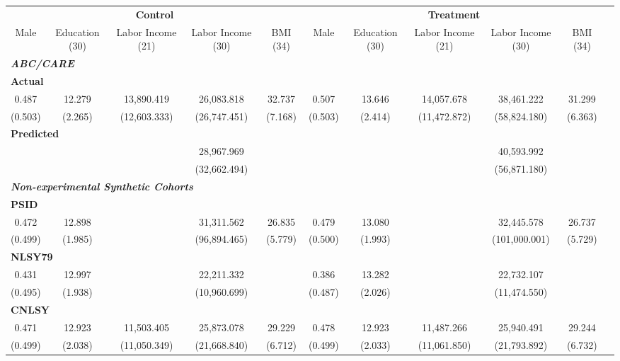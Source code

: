 \begin{tabular}{ccccccccccc} \toprule
\multicolumn{5}{c}{\textbf{Control}} & \multicolumn{5}{c}{\textbf{Treatment}} \\
Male  & Education (30)  & Labor Income (21) & Labor Income (30)  & BMI (34) & Male  & Education (30)  & Labor Income (21) & Labor Income (30)  & BMI (34)  \\  \midrule
\multicolumn{10}{l}{\textit{\textbf{ABC/CARE}}} \\
\multicolumn{10}{l}{\textbf{Actual}} \\
    0.487 &    12.279 & 13,890.419 & 26,083.818 &    32.737 &     0.507 &    13.646 & 14,057.678 & 38,461.222 &    31.299 \\  
    (0.503) &     (2.265) & (12,603.333) & (26,747.451) &     (7.168) &     (0.503) &     (2.414) & (11,472.872) & (58,824.180) &     (6.363) \\  
\multicolumn{10}{l}{\textbf{Predicted}} \\
        &         &         & 28,967.969 &         &         &         &         & 40,593.992 &         \\  
        &         &         & (32,662.494) &         &         &         &         & (56,871.180) &         \\  
        \multicolumn{10}{l}{\textit{\textbf{Non-experimental Synthetic Cohorts}}} \\
\multicolumn{10}{l}{\textbf{PSID}} \\
    0.472 &    12.898 &    & 31,311.562 &    26.835 &     0.479 &    13.080 &    & 32,445.578 &    26.737 \\  
    (0.499) &     (1.985) &     & (96,894.465) &     (5.779) &     (0.500) &     (1.993) &      &  (101,000.001) &     (5.729) \\  
\multicolumn{10}{l}{\textbf{NLSY79}} \\
    0.431 &    12.997 &   & 22,211.332 &  &     0.386 &    13.282 &   & 22,732.107 &  \\  
    (0.495) &     (1.938) &   & (10,960.699) & &     (0.487) &     (2.026) &   & (11,474.550) &  \\  
    \multicolumn{10}{l}{\textbf{CNLSY}} \\  
    0.471 &    12.923 & 11,503.405 & 25,873.078 &    29.229 &     0.478  &  12.923 & 11,487.266 & 25,940.491 &    29.244 \\  
    (0.499) &     (2.038) & (11,050.349) & (21,668.840) &     (6.712) &     (0.499) &     (2.033) & (11,061.850) & (21,793.892) &     (6.732) \\ 

\end{tabular}
